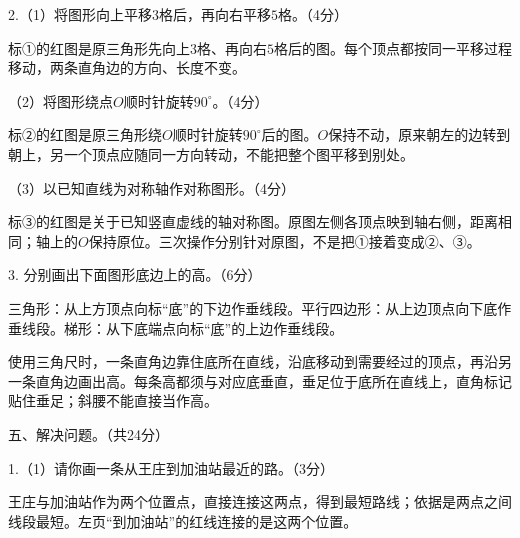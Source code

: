 2.（1）将图形向上平移\(3\)格后，再向右平移\(5\)格。（4分）\par
{}
\begin{BookAnswer}
标①的红图是原三角形先向上\(3\)格、再向右\(5\)格后的图。每个顶点都按同一平移过程移动，两条直角边的方向、长度不变。
\end{BookAnswer}

（2）将图形绕点\(O\)顺时针旋转\(90^\circ\)。（4分）\par
{}
\begin{BookAnswer}
标②的红图是原三角形绕\(O\)顺时针旋转\(90^\circ\)后的图。\(O\)保持不动，原来朝左的边转到朝上，另一个顶点应随同一方向转动，不能把整个图平移到别处。
\end{BookAnswer}

（3）以已知直线为对称轴作对称图形。（4分）\par
{}
\begin{BookAnswer}
标③的红图是关于已知竖直虚线的轴对称图。原图左侧各顶点映到轴右侧，距离相同；轴上的\(O\)保持原位。三次操作分别针对原图，不是把①接着变成②、③。
\end{BookAnswer}

3. 分别画出下面图形底边上的高。（6分）\par
{}
\begin{BookAnswer}
三角形：从上方顶点向标“底”的下边作垂线段。平行四边形：从上边顶点向下底作垂线段。梯形：从下底端点向标“底”的上边作垂线段。\par 使用三角尺时，一条直角边靠住底所在直线，沿底移动到需要经过的顶点，再沿另一条直角边画出高。每条高都须与对应底垂直，垂足位于底所在直线上，直角标记贴住垂足；斜腰不能直接当作高。
\end{BookAnswer}

五、解决问题。（共24分）\par 1.（1）请你画一条从王庄到加油站最近的路。（3分）\par
{}
\begin{BookAnswer}
王庄与加油站作为两个位置点，直接连接这两点，得到最短路线；依据是两点之间线段最短。左页“到加油站”的红线连接的是这两个位置。
\end{BookAnswer}

